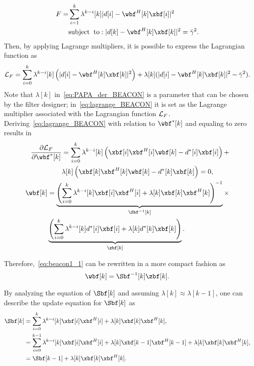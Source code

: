 \begin{align}\label{eq:PAPA_der_BEACON}
\begin{split}
	F = & \sum_{i = 1}^k \lambda^{k-i}[k] \vert d[i] - \wbf^H[k]\xbf[i]\vert^2 \\
	&\mathrm{subject\;\;to:\;}  \vert d[k] - \wbf^H[k]\xbf[k]\vert^2 = \bar{\gamma}^2.
\end{split}
\end{align}
Then, by applying Lagrange multipliers, it is possible to express the Lagrangian function as
\begin{align}\label{eq:lagrange_BEACON}
	\mathcal{L}_F  = \sum_{i = 0}^k \lambda^{k-i}[k]\left( \vert d[i] -\wbf^H[k]\xbf[k] \vert^2\right) + \lambda[k](\vert d[i] -\wbf^H[k]\xbf[k] \vert^2 - \bar{\gamma}^2).
\end{align}
Note that $\lambda[k]$ in~\eqref{eq:PAPA_der_BEACON} is a parameter that can be chosen by the filter designer; in~\eqref{eq:lagrange_BEACON} it is set as the Lagrange multiplier associated with the Lagrangian function ${\cal L}_F$. Deriving~\eqref{eq:lagrange_BEACON} with relation to $\wbf^*[k]$ and equaling to zero results in
\begin{align}
	\begin{split}
		\hspace*{-3cm}\frac{\partial \mathcal{L}_F}{\partial \wbf^*[k]} &= \sum_{i = 0}^k \lambda^{k-i}[k] \left(\xbf[i]\xbf^H[i]\wbf[k] - d^*[i]\xbf[i]\right) + \\
		&\lambda[k] \left(\xbf[k]\xbf^H[k]\wbf[k] - d^*[k]\xbf[k]\right) = 0,\\
	\end{split}\\
	\begin{split}\label{eq:beacon1_1}
		\wbf[k] &= \underbrace{\left(\sum_{i = 0}^k \lambda^{k-i}[k] \xbf[i]\xbf^H[i] + \lambda[k]\xbf[k]\xbf^H[k]\right)^{-1}}_{\Sbf^{-1}[k]}\times \\
		&\underbrace{\left(\sum_{i = 0}^k \lambda^{k-i}[k]d^*[i]\xbf[i] + \lambda[k]d^*[k]\xbf[k]\right)}_{\zbf[k]}.
	\end{split}
\end{align}

Therefore,~\eqref{eq:beacon1_1} can be rewritten in a more compact fashion as
\begin{align}\label{eq:w_beacon1}
	\wbf[k] = \Sbf^{-1}[k] \zbf[k].
\end{align}

By analyzing the equation of $\Sbf[k]$ and assuming $\lambda[k] \approx \lambda[k-1]$, one can describe the update equation for $\Sbf[k]$ as
\begin{align}
	\Sbf[k] &= \sum_{i = 0}^k \lambda^{k-i}[k] \xbf[i]\xbf^H[i] + \lambda[k]\xbf[k]\xbf^H[k], \nonumber\\
	&= \sum_{i = 0}^{k-1} \lambda^{k-i}[k] \xbf[i]\xbf^H[i] + \lambda[k]\xbf[k-1]\xbf^H[k-1] + \lambda[k]\xbf[k]\xbf^H[k],\nonumber\\
	&= \Sbf[k-1] + \lambda[k]\xbf[k]\xbf^H[k].\label{eq:s_beacon}
\end{align}

